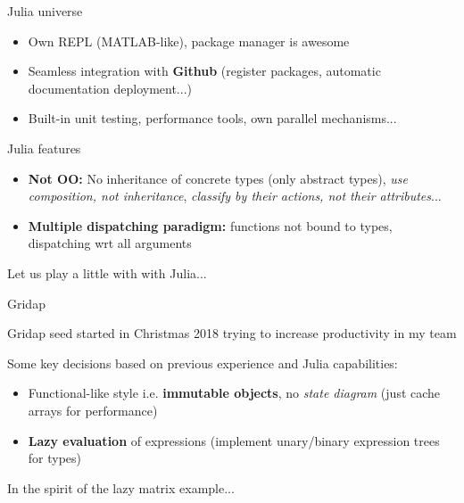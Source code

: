 \begin{frame}{Julia universe}

\begin{itemize}

  \item Own REPL (MATLAB-like), package manager is awesome


  \item Seamless integration with \textbf{Github} (register packages, automatic {\color{red} documentation} deployment...)

  \item Built-in unit testing,  performance tools, own parallel mechanisms...

\end{itemize}

\end{frame}

\begin{frame}{Julia features}

\begin{itemize}

  \item \textbf{Not OO:} No inheritance of concrete types (only abstract types), \emph{use composition, not inheritance}, \emph{classify by their actions, not their attributes}...

  \item \textbf{Multiple dispatching paradigm:} functions not bound to types, dispatching wrt all arguments


\end{itemize}

\pause

{\large \color{red} Let us play a little with with Julia...}

\end{frame}

\begin{frame}{Gridap}

Gridap seed started in Christmas 2018 trying to increase productivity in my team

Some key decisions based on previous experience and Julia capabilities:

\begin{itemize}

  \item Functional-like style i.e. \textbf{immutable objects}, no \emph{state diagram} (just cache arrays for performance)

  \item \textbf{Lazy evaluation} of expressions (implement unary/binary expression trees for types)

\end{itemize}

In the spirit of the lazy matrix example...

\end{frame}

